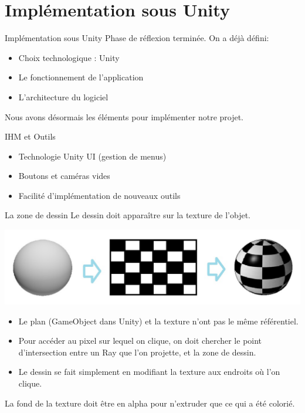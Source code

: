 \documentclass[a4paper,10pt]{beamer}
\begin{document}
	\section{Implémentation sous Unity}
			\begin{frame}{Implémentation sous Unity}
				Phase de réflexion terminée. On a déjà défini:
					\begin{itemize}
						\item Choix technologique : Unity
						\item Le fonctionnement de l'application
						\item L'architecture du logiciel
					\end{itemize}
					
				Nous avons désormais les éléments pour implémenter notre projet.
			\end{frame}
		
		
	\begin{frame}{IHM et Outils}

				\begin{itemize}
					\item Technologie Unity UI (gestion de menus)
					\item Boutons et caméras vides
					\item Facilité d'implémentation de nouveaux outils
				\end{itemize}
			
	\end{frame}
	

	
	\begin{frame}{La zone de dessin}
		Le dessin doit apparaître sur la texture de l'objet.
			\centerline{\includegraphics[scale=0.4]{images/intro/spheres.jpg}}
			
			\begin{itemize}
				\item Le plan (GameObject dans Unity) et la texture n'ont pas le même référentiel. 
				\item Pour accéder au pixel sur lequel on clique, on doit chercher le point d'intersection entre un Ray que l'on projette, et la zone de dessin.
				\item Le dessin se fait simplement en modifiant la texture aux endroits où  l'on clique.
			\end{itemize} 
		La fond de la texture doit être en alpha pour n'extruder que ce qui a été colorié.
	\end{frame}
	
\end{document}
